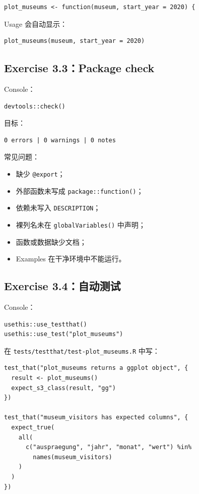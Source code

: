 \documentclass[11pt,a4paper]{ctexart}
\begin{document}
\begin{lstlisting}
plot_museums <- function(museum, start_year = 2020) {
\end{lstlisting}

Usage 会自动显示：

\begin{verbatim}
plot_museums(museum, start_year = 2020)
\end{verbatim}

\subsection{Exercise 3.3：Package check}

Console：

\begin{lstlisting}
devtools::check()
\end{lstlisting}

目标：

\begin{verbatim}
0 errors | 0 warnings | 0 notes
\end{verbatim}

常见问题：

\begin{itemize}
  \item 缺少 \texttt{@export}；
  \item 外部函数未写成 \texttt{package::function()}；
  \item 依赖未写入 \texttt{DESCRIPTION}；
  \item 裸列名未在 \texttt{globalVariables()} 中声明；
  \item 函数或数据缺少文档；
  \item Examples 在干净环境中不能运行。
\end{itemize}

\subsection{Exercise 3.4：自动测试}

Console：

\begin{lstlisting}
usethis::use_testthat()
usethis::use_test("plot_museums")
\end{lstlisting}

在 \texttt{tests/testthat/test-plot\_museums.R} 中写：

\begin{lstlisting}
test_that("plot_museums returns a ggplot object", {
  result <- plot_museums()
  expect_s3_class(result, "gg")
})

test_that("museum_visitors has expected columns", {
  expect_true(
    all(
      c("auspraegung", "jahr", "monat", "wert") %in%
        names(museum_visitors)
    )
  )
})
\end{lstlisting}
\end{document}
